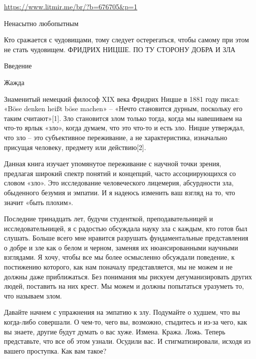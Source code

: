  
 
 
 
 

\url{https://www.litmir.me/br/?b=676705&p=1}

Ненасытно любопытным

Кто сражается с чудовищами, тому следует остерегаться, чтобы самому при этом не стать чудовищем.
ФРИДРИХ НИЦШЕ. ПО ТУ СТОРОНУ ДОБРА И ЗЛА

Введение

Жажда

Знаменитый немецкий философ XIX века Фридрих Ницше в 1881 году писал: «Böse
denken heißt böse machen» – «Нечто становится дурным, поскольку его таким
считают»[1]. Зло становится злом только тогда, когда мы навешиваем на что-то
ярлык «зло», когда думаем, что это что-то и есть зло. Ницше утверждал, что зло
– это субъективное переживание, а не характеристика, изначально присущая
человеку, предмету или действию[2].

Данная книга изучает упомянутое переживание с научной точки зрения, предлагая
широкий спектр понятий и концепций, часто ассоциирующихся со словом «зло». Это
исследование человеческого лицемерия, абсурдности зла, обыденного безумия и
эмпатии. И я надеюсь изменить ваш взгляд на то, что значит «быть плохим».

Последние тринадцать лет, будучи студенткой, преподавательницей и
исследовательницей, я с радостью обсуждала науку зла с каждым, кто готов был
слушать. Больше всего мне нравится разрушать фундаментальные представления о
добре и зле как о белом и черном, заменяя их нюансированными научными
взглядами. Я хочу, чтобы все мы более осмысленно обсуждали поведение, к
постижению которого, как нам поначалу представляется, мы не можем и не должны
даже приближаться. Без понимания мы рискуем дегуманизировать других людей,
поставить на них крест. Мы можем и должны попытаться уразуметь то, что называем
злом.

Давайте начнем с упражнения на эмпатию к злу. Подумайте о худшем, что вы когда-либо совершали. О чем-то, чего вы, возможно, стыдитесь и из-за чего, как вы знаете, другие будут думать о вас хуже. Измена. Кража. Ложь. Теперь представьте, что все об этом узнали. Осудили вас. И стигматизировали, исходя из вашего проступка. Как вам такое?

